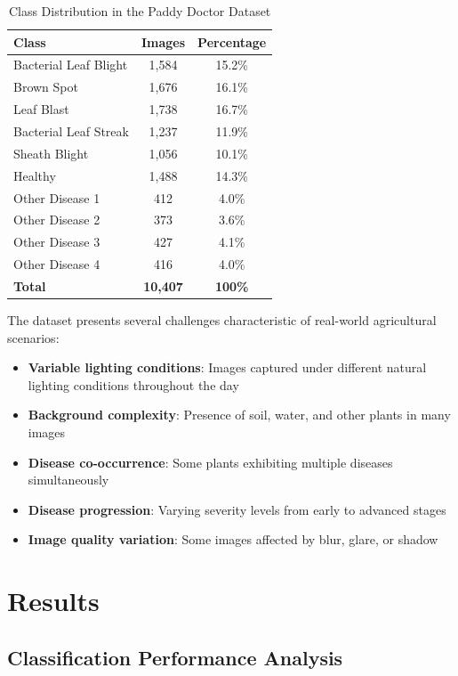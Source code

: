 \documentclass[agriculture,article,submit,pdftex,moreauthors]{Definitions/mdpi}
\begin{document}
\begin{table}[H]
\centering
\caption{Class Distribution in the Paddy Doctor Dataset}
\label{tab:dataset-distribution}
\begin{tabular}{lcc}
\hline
\textbf{Class} & \textbf{Images} & \textbf{Percentage} \\
\hline
Bacterial Leaf Blight & 1,584 & 15.2\% \\
Brown Spot & 1,676 & 16.1\% \\
Leaf Blast & 1,738 & 16.7\% \\
Bacterial Leaf Streak & 1,237 & 11.9\% \\
Sheath Blight & 1,056 & 10.1\% \\
Healthy & 1,488 & 14.3\% \\
Other Disease 1 & 412 & 4.0\% \\
Other Disease 2 & 373 & 3.6\% \\
Other Disease 3 & 427 & 4.1\% \\
Other Disease 4 & 416 & 4.0\% \\
\hline
\textbf{Total} & \textbf{10,407} & \textbf{100\%} \\
\hline
\end{tabular}
\end{table}

The dataset presents several challenges characteristic of real-world agricultural scenarios:

\begin{itemize}
    \item \textbf{Variable lighting conditions}: Images captured under different natural lighting conditions throughout the day
    \item \textbf{Background complexity}: Presence of soil, water, and other plants in many images
    \item \textbf{Disease co-occurrence}: Some plants exhibiting multiple diseases simultaneously
    \item \textbf{Disease progression}: Varying severity levels from early to advanced stages
    \item \textbf{Image quality variation}: Some images affected by blur, glare, or shadow
\end{itemize}


\section{Results}

\subsection{Classification Performance Analysis}
\end{document}
